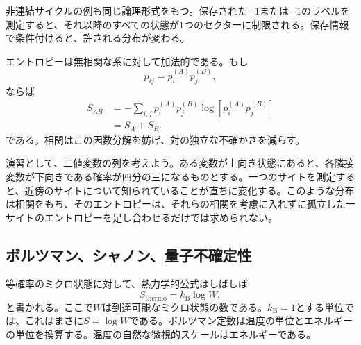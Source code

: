 非連結サイクルの例も同じ論理形式をもつ。保存された\(+1\)または\(-1\)のラベルを測定すると、それ以降のすべての状態が1つのセクターに制限される。保存情報で条件付けると、許される分布が変わる。

エントロピーは無相関な系に対して加法的である。もし
\begin{equation}
 p_{ij}=p_i^{(A)}p_j^{(B)},
\end{equation}
ならば
\begin{align}
 S_{AB}
 &=-\sum_{i,j}p_i^{(A)}p_j^{(B)}
 \log\!\left[p_i^{(A)}p_j^{(B)}\right]\\
 &=S_A+S_B.
 \label{eq:sm1-entropy-additivity}
\end{align}
である。相関はこの因数分解を妨げ、対の独立な不確かさを減らす。

演習として、二値変数の列を考えよう。ある変数が上向き状態にあると、各隣接変数が下向きである確率が四分の三になるものとする。一つのサイトを測定すると、近傍のサイトについて知られていることが直ちに変化する。このような分布は相関をもち、そのエントロピーは、それらの相関を考慮に入れずに孤立した一サイトのエントロピーを足し合わせるだけでは求められない。

\subsection{ボルツマン、シャノン、量子不確定性}

\begin{classroomqa}
\end{classroomqa}

等確率のミクロ状態に対して、熱力学的公式はしばしば
\begin{equation}
 S_{\mathrm{thermo}}=k_{\mathrm B}\log W,
 \label{eq:sm1-boltzmann-formula}
\end{equation}
と書かれる。ここで\(W\)は到達可能なミクロ状態の数である。\(k_{\mathrm B}=1\)とする単位では、これはまさに\(S=\log W\)である。ボルツマン定数は温度の単位とエネルギーの単位を換算する。温度の自然な微視的スケールはエネルギーである。

\begin{classroomqa}
\end{classroomqa}

